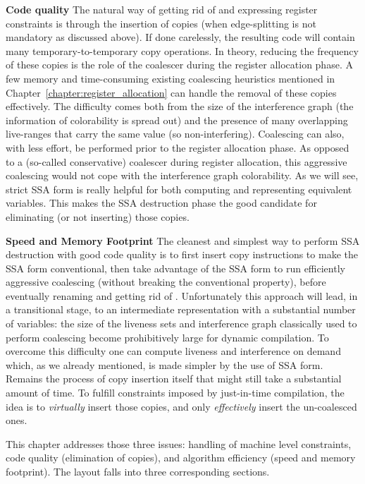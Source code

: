 {\bf Code quality}
The natural way of getting rid of \phifuns and expressing register constraints is through the insertion of copies (when edge-splitting is not mandatory as discussed above). If done carelessly, the resulting code will contain many temporary-to-temporary copy operations. In theory, reducing the frequency of these copies is the role of the coalescer during the register allocation phase.
A few memory and time-consuming existing coalescing heuristics mentioned in Chapter~\ref{chapter:register_allocation} can handle the removal of these copies effectively. The difficulty comes both from the size of the interference graph (the information of colorability is spread out) and the presence of many overlapping live-ranges that carry the same value (so non-interfering).
Coalescing can also, with less effort, be performed prior to the register allocation phase. As opposed to a (so-called conservative) coalescer during register allocation, this aggressive coalescing would not cope with the interference graph colorability. As we will see, strict SSA form is really helpful for both computing and representing equivalent variables. This makes the SSA destruction phase the good candidate for eliminating (or not inserting) those copies.

{\bf Speed and Memory Footprint} 
The cleanest and simplest way to perform SSA destruction with good code quality is to first insert copy instructions to make the SSA form conventional, then take advantage of the SSA form to run efficiently aggressive coalescing (without breaking the conventional property), before eventually renaming \phiwebs\index{\phiweb} and getting rid of \phifuns. Unfortunately this approach will lead, in a transitional stage, to an intermediate representation with a substantial number of variables: the size of the liveness sets and interference graph classically used to perform coalescing become prohibitively large for dynamic compilation. To overcome this difficulty one can compute liveness and interference on demand which, as we already mentioned, is made simpler by the use of SSA form. Remains the process of copy insertion itself that might still take a substantial amount of time. To fulfill constraints imposed by just-in-time compilation, the idea is to \emph{virtually} insert those copies, and only \emph{effectively} insert the un-coalesced ones.    

This chapter addresses those three issues: handling of machine level constraints, code quality (elimination of copies), and algorithm efficiency (speed and memory footprint). The layout falls into three corresponding sections.
